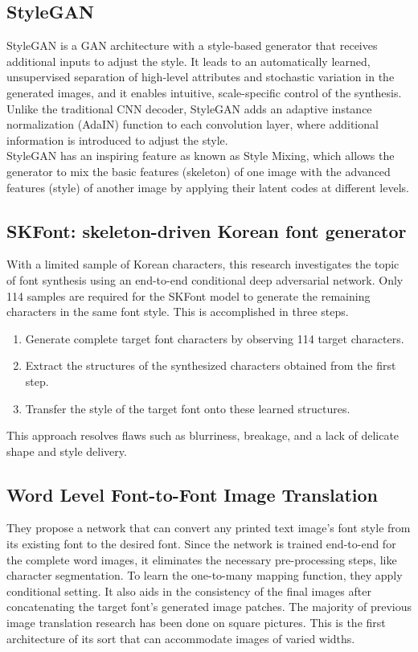 \documentclass[letterpaper]{article}
\begin{document}
\subsection{StyleGAN}
StyleGAN is a GAN architecture with a style-based generator that receives additional inputs to adjust the style. It leads to an automatically learned, unsupervised separation of high-level attributes and stochastic variation in the generated images, and it enables intuitive, scale-specific control of the synthesis.
\\
Unlike the traditional CNN decoder, StyleGAN adds an adaptive instance normalization (AdaIN) function to each convolution layer, where additional information is introduced to adjust the style.
\\
StyleGAN has an inspiring feature as known as Style Mixing, which allows the generator to mix the basic features (skeleton) of one image with the advanced features (style) of another image by applying their latent codes at different levels.

\subsection{SKFont: skeleton-driven Korean font generator}
With a limited sample of Korean characters, this research investigates the topic of font synthesis using an end-to-end conditional deep adversarial network. Only 114 samples are required for the SKFont model to generate the remaining characters in the same font style. This is accomplished in three steps.

\begin{enumerate}
\item Generate complete target font characters by observing 114 target characters.
\item Extract the structures of the synthesized characters obtained from the first step.
\item Transfer the style of the target font onto these learned structures.
\end{enumerate}
This approach resolves flaws such as blurriness, breakage, and a lack of delicate shape and style delivery.


\subsection{Word Level Font-to-Font Image Translation}
They propose a network that can convert any printed text image's font style from its existing font to the desired font. Since the network is trained end-to-end for the complete word images, it eliminates the necessary pre-processing steps, like character segmentation. To learn the one-to-many mapping function, they apply conditional setting. It also aids in the consistency of the final images after concatenating the target font's generated image patches. The majority of previous image translation research has been done on square pictures. This is the first architecture of its sort that can accommodate images of varied widths.
\end{document}
